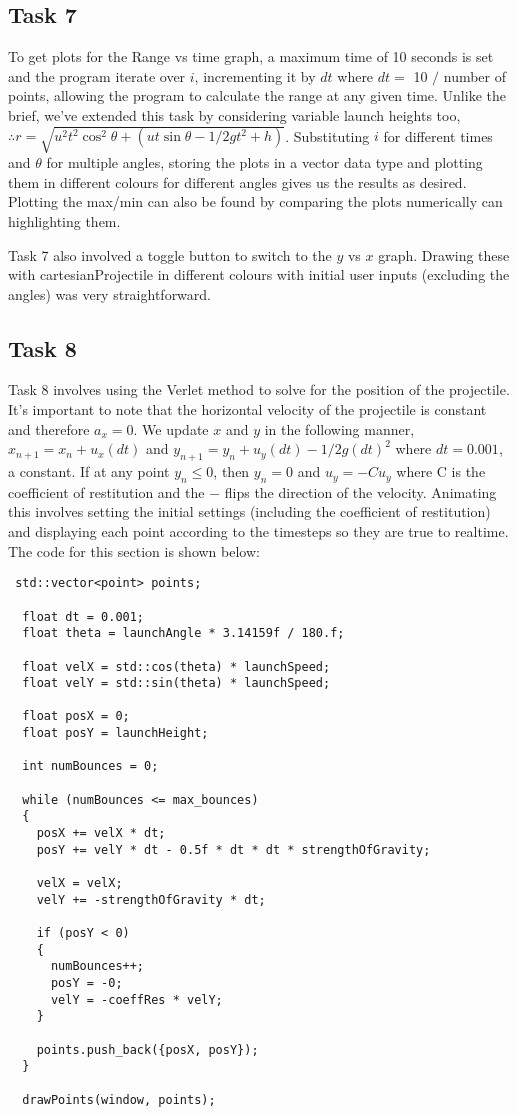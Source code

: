 \documentclass[main.tex]{subfiles}
\begin{document}
\subsection{Task 7}

To get plots for the Range vs time graph, a maximum time of 10 seconds is set and the program iterate over $i$, incrementing it by $dt$ where $dt =$ 10 $/$ number of points, allowing the program to calculate the range at any given time. Unlike the brief, we've extended this task by considering variable launch heights too, $\therefore r = \sqrt{u^2t^2\cos^2\theta + \left(ut\sin\theta - 1/2 gt^2 +h\right)}$. Substituting $i$ for different times and $\theta$ for multiple angles, storing the plots in a vector data type and plotting them in different colours for different angles gives us the results as desired. Plotting the max/min can also be found by comparing the plots numerically can highlighting them.

\noindent Task 7 also involved a toggle button to switch to the $y$ vs $x$ graph. Drawing these with cartesianProjectile in different colours with initial user inputs (excluding the angles) was very straightforward.

\subsection{Task 8}
Task 8 involves using the Verlet method to solve for the position of the projectile. It's important to note that the horizontal velocity of the projectile is constant and therefore $a_x = 0$. We update $x$ and $y$ in the following manner, $x_{n+1} = x_n + u_x  (dt)$ and $y_{n+1} = y_n + u_y(dt) -1/2 g (dt)^2$ where $dt = 0.001$, a constant. If at any point $y_n \leq 0$, then $y_n = 0$ and $u_y = -C u_y$ where C is the coefficient of restitution and the $-$ flips the direction of the velocity. Animating this involves setting the initial settings (including the coefficient of restitution) and displaying each point according to the timesteps so they are true to realtime. The code for this section is shown below:

\begin{lstlisting}
 std::vector<point> points;

  float dt = 0.001;
  float theta = launchAngle * 3.14159f / 180.f;

  float velX = std::cos(theta) * launchSpeed;
  float velY = std::sin(theta) * launchSpeed;

  float posX = 0;
  float posY = launchHeight;

  int numBounces = 0;

  while (numBounces <= max_bounces)
  {
    posX += velX * dt;
    posY += velY * dt - 0.5f * dt * dt * strengthOfGravity;

    velX = velX;
    velY += -strengthOfGravity * dt;

    if (posY < 0)
    {
      numBounces++;
      posY = -0;
      velY = -coeffRes * velY;
    }

    points.push_back({posX, posY});
  }

  drawPoints(window, points);
\end{lstlisting}
\end{document}
